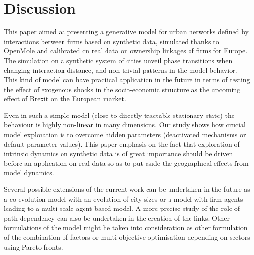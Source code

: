 \documentclass[11pt]{article}
\begin{document}
\section{Discussion}

This paper aimed at presenting a generative model for urban networks defined by interactions between firms based on synthetic data, simulated thanks to OpenMole and calibrated on real data on ownership linkages of firms for Europe. The simulation on a synthetic system of cities unveil phase transitions when changing interaction distance, and non-trivial patterns in the model behavior. This kind of model can have practical application in the future in terms of testing the effect of exogenous shocks in the socio-economic structure as the upcoming effect of Brexit on the European market.

Even in such a simple model (close to directly tractable stationary state) the behaviour is highly non-linear in many dimensions. Our study shows how crucial model exploration is to overcome hidden parameters (deactivated mechanisms or default parameter values). This paper emphasis on the fact that exploration of intrinsic dynamics on synthetic data is of great importance should be driven before an application on real data so as to put aside the geographical effects from model dynamics.

Several possible extensions of the current work can be undertaken in the future as a co-evolution model with an evolution of city sizes or a model with firm agents leading to a multi-scale agent-based model. A more precise study of the role of path dependency can also be undertaken in the creation of the links. Other formulations of the model might be taken into consideration as other formulation of the combination of factors or multi-objective optimisation depending on sectors using Pareto fronts.  




%


\end{document}
